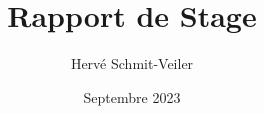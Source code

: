 \documentclass{report}
\title{\Huge{Rapport de Stage}}
\author{Hervé Schmit-Veiler}
\date{Septembre 2023}
\begin{document}
\maketitle

\tableofcontents

\begingroup

\endgroup

\begingroup
\let\clearpage\relax

\endgroup

\begingroup
\let\clearpage\relax

\endgroup

\begingroup
\let\clearpage\relax

\endgroup

\begingroup
\let\clearpage\relax

\endgroup

\begingroup
\let\clearpage\relax

\endgroup

\printbibliography
\end{document}
